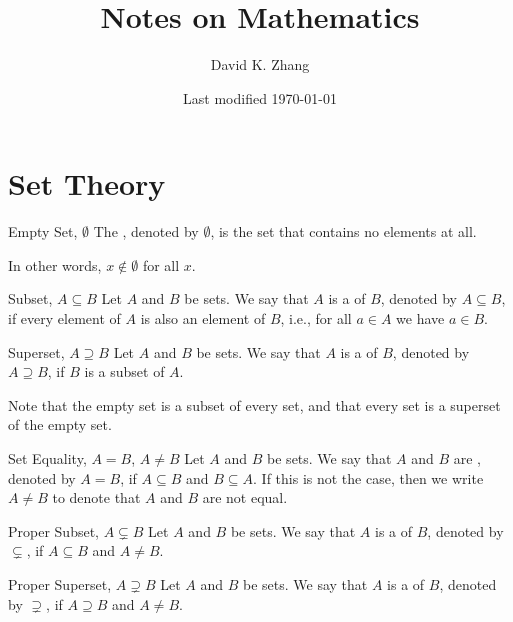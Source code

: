 \documentclass[12pt]{report}
\title{Notes on Mathematics}
\author{David K. Zhang}
\date{Last modified \today}
\begin{document}
\maketitle
{}
\listofdefinition
\clearpage
\listoftheorem
\clearpage
{}



\chapter{Set Theory}

\begin{dfnbox}{Empty Set, $\emptyset$}
	The , denoted by $\emptyset$, is the set that contains no elements at all.
\end{dfnbox}

In other words, $x \notin \emptyset$ for all $x$.

\begin{dfnbox}{Subset, $A \subseteq B$}
	Let $A$ and $B$ be sets. We say that $A$ is a  of $B$, denoted by $A \subseteq B$, if every element of $A$ is also an element of $B$, i.e., for all $a \in A$ we have $a \in B$.
\end{dfnbox}

\begin{dfnbox}{Superset, $A \supseteq B$}
	Let $A$ and $B$ be sets. We say that $A$ is a  of $B$, denoted by $A \supseteq B$, if $B$ is a subset of $A$.
\end{dfnbox}

Note that the empty set is a subset of every set, and that every set is a superset of the empty set.

\begin{dfnbox}{Set Equality, $A = B$, $A \ne B$}
	Let $A$ and $B$ be sets. We say that $A$ and $B$ are , denoted by $A = B$, if $A \subseteq B$ and $B \subseteq A$. If this is not the case, then we write $A \ne B$ to denote that $A$ and $B$ are not equal.
\end{dfnbox}

\begin{dfnbox}{Proper Subset, $A \subsetneq B$}
	Let $A$ and $B$ be sets. We say that $A$ is a  of $B$, denoted by $\subsetneq$, if $A \subseteq B$ and $A \ne B$.
\end{dfnbox}

\begin{dfnbox}{Proper Superset, $A \supsetneq B$}
	Let $A$ and $B$ be sets. We say that $A$ is a  of $B$, denoted by $\supsetneq$, if $A \supseteq B$ and $A \ne B$.
\end{dfnbox}
\end{document}
